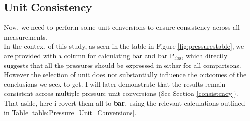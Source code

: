 \documentclass{article}
\newcounter{dataset}
\newenvironment{datasetbox}[2]{
	\refstepcounter{dataset}
	\begin{tcolorbox}[
		title={\color{black}\textbf{Dataset \thedataset: #1}},
		colback=black!4!white,
		colframe=black!10!white,
		boxrule=0.5mm,
		width=\textwidth,
		label={#2}]
	}{\end{tcolorbox}}
\begin{document}
\begin{minipage}{1.1\textwidth}
\begin{datasetbox}{Calibrated Data}{data:zero}
\begin{minipage}{0.76\textwidth}
\begin{tcolorbox}[
			title={\color{black}\normalsize \textbf{Pressure measuring instruments}},
			colback=MetallicSunburst!6!white, 
			colframe=ChineseGold!30!white, 
			boxrule=0.5mm, 
			width=1\textwidth
			]
\begin{minipage}{1.01\textwidth}
\begin{minipage}{0.22\textwidth}
				\end{minipage}
			\end{minipage}		
		\end{tcolorbox}		
	\end{minipage}
\end{datasetbox}
	\end{minipage}
	
\newpage{}
\subsection{Unit Consistency}
Now, we need to perform some unit conversions to ensure consistency across all measurements.\\[8pt]
In the context of this study, as seen in the table in Figure \ref{fig:pressurestable}, we are provided with a column for calculating bar and bar \(\text{P}_\text{abs}\), which directly suggests that all the pressures should be expressed in either for all comparisons.\\[8pt] However the selection of unit does not substantially influence the outcomes of the conclusions we seek to get. I will later demonstrate that the results remain consistent across multiple pressure unit conversions (See Section \ref{consistency}).\\[8pt]
That aside, here i covert them all to \textbf{bar}, using the relevant calculations outlined in Table \ref{table:Pressure_Unit_Conversions}.
\end{document}
